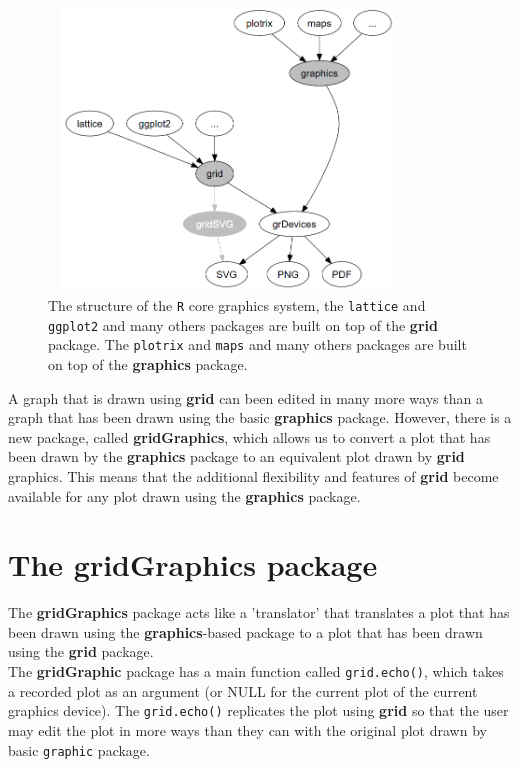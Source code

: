 \documentclass{report}
\begin{document}
\begin{figure}[h]
	\begin{center}
		\includegraphics[height = 7.5cm, width = 9.5cm]{figure/intro.png}
		\caption{The structure of the \texttt{R} core graphics system, the \texttt{lattice} \citep{lattice}  and \texttt{ggplot2} \citep{ggplot2} and many others packages are built on top of the \textbf{grid} package. The \texttt{plotrix} \citep{plotrix} and \texttt{maps} \citep{maps} and many others packages are built on top of the \textbf{graphics} package. }
		\label{intro}
	\end{center}
\end{figure}

A graph that is drawn using \textbf{grid} can been edited in many more ways than a graph that has been drawn using the basic \textbf{graphics} package. However, there is a new package, called \textbf{gridGraphics}, which allows us to convert a plot that has been drawn by the \textbf{graphics} package to an equivalent plot drawn by \textbf{grid} graphics. This means that the additional flexibility and features of \textbf{grid} become available for any plot drawn using the \textbf{graphics} package. \\

\section{The \textbf{gridGraphics} package}
The \textbf{gridGraphics} \citep{gGpackage} package acts like a 'translator' that translates a plot that has been drawn using the \textbf{graphics}-based package to a plot that has been drawn using the \textbf{grid} package. \\

The \textbf{gridGraphic} package has a main function called \texttt{grid.echo()}, which takes a recorded plot as an argument (or NULL for the current plot of the current graphics device). The \texttt{grid.echo()} replicates the plot using \textbf{grid} so that the user may edit the plot in more ways than they can with the original plot drawn by basic \texttt{graphic} package.\\
\end{document}
